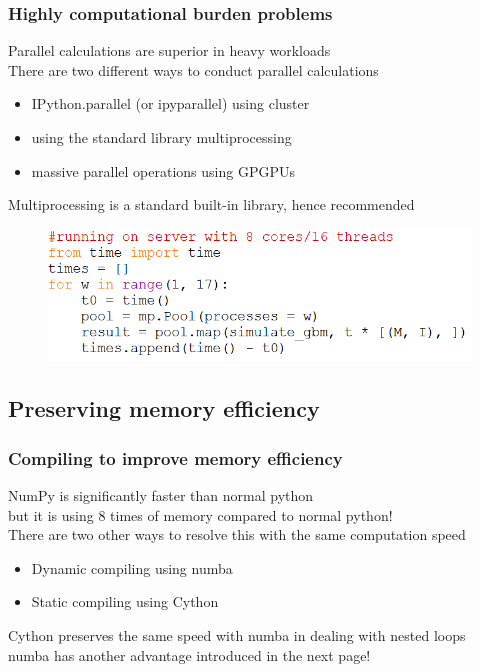 \documentclass{beamer}
\begin{document}
\begin{frame}
\frametitle{Highly computational burden problems}
Parallel calculations are superior in heavy workloads\\
There are two different ways to conduct parallel calculations
\begin{itemize}
	\item IPython.parallel (or ipyparallel) using cluster
	\item using the standard library multiprocessing
	\item massive parallel operations using GPGPUs
\end{itemize}
Multiprocessing is a standard built-in library, hence recommended
\begin{figure}[H]
	\includegraphics[scale=0.6]{multiprocessing.png}
\end{figure}
\end{frame}


\subsection{Preserving memory efficiency}

\begin{frame}
\frametitle{Compiling to improve memory efficiency}
NumPy is significantly faster than normal python\\
but it is using 8 times of memory compared to normal python!\\
There are two other ways to resolve this with the same computation speed
\begin{itemize}
	\item Dynamic compiling using numba
	\item Static compiling using Cython
\end{itemize}
Cython preserves the same speed with numba in dealing with nested loops\\
numba has another advantage introduced in the next page!
\end{frame}
\end{document}
